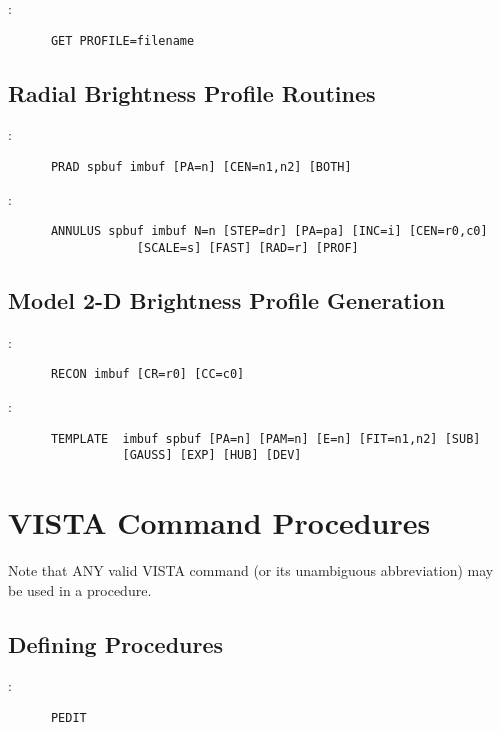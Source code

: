 \noindent {}:
\begin{verbatim}
      GET PROFILE=filename
\end{verbatim}

\subsection{Radial Brightness Profile Routines}

:
\begin{verbatim}
      PRAD spbuf imbuf [PA=n] [CEN=n1,n2] [BOTH]
\end{verbatim}

\noindent {}:
\begin{verbatim}
      ANNULUS spbuf imbuf N=n [STEP=dr] [PA=pa] [INC=i] [CEN=r0,c0]
			      [SCALE=s] [FAST] [RAD=r] [PROF]
\end{verbatim}

\subsection{Model 2-D Brightness Profile Generation}

:
\begin{verbatim}
      RECON imbuf [CR=r0] [CC=c0]
\end{verbatim}

\noindent {}:
\begin{verbatim}
      TEMPLATE  imbuf spbuf [PA=n] [PAM=n] [E=n] [FIT=n1,n2] [SUB]
			    [GAUSS] [EXP] [HUB] [DEV]
\end{verbatim}


\section{VISTA Command Procedures}

Note that ANY valid VISTA command (or its unambiguous abbreviation) may be
used in a procedure.

\subsection{Defining Procedures}

:
\begin{verbatim}
      PEDIT
\end{verbatim}

